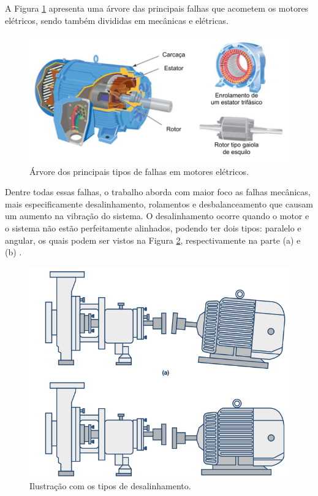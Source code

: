 A Figura \ref{fig:faults_rilski_p77} apresenta uma árvore das principais falhas que acometem os motores elétricos, sendo também divididas
em mecânicas e elétricas. 

\begin{figure}[H]
    \caption{Árvore dos principais tipos de falhas em motores elétricos.}
    \begin{center}
        \includegraphics[scale=1, page=3]{referencial/img/imagens_referencial.pdf}
    \end{center}
    \label{fig:faults_rilski_p77}
\end{figure}

Dentre todas essas falhas, o trabalho aborda com maior foco as falhas mecânicas, mais especificamente desalinhamento, rolamentos 
e desbalanceamento que causam um aumento na vibração do sistema. O desalinhamento ocorre quando o motor e o sistema não estão perfeitamente alinhados, podendo ter dois tipos:
paralelo e angular, os quais podem ser vistos na Figura \ref{fig:misadraw_analog_p2}, respectivamente na parte (a) e (b) 
\cite{Sopcik2019}.

\begin{figure}[H]
    \caption{Ilustração com os tipos de desalinhamento.}
    \begin{center}
        \includegraphics[scale=.35]{referencial/img/misadraw_analog_p2.png}
    \end{center}
    \label{fig:misadraw_analog_p2}
\end{figure}

